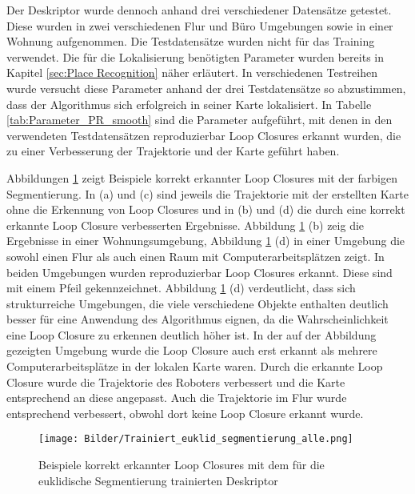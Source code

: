 Der Deskriptor wurde dennoch anhand drei verschiedener Datensätze getestet. Diese wurden in zwei verschiedenen Flur und Büro Umgebungen sowie in einer Wohnung aufgenommen. Die Testdatensätze wurden nicht für das Training verwendet. Die für die Lokalisierung benötigten Parameter wurden bereits in Kapitel \ref{sec:Place Recognition} näher erläutert. In verschiedenen Testreihen wurde versucht diese Parameter anhand der drei Testdatensätze so abzustimmen, dass der Algorithmus sich erfolgreich in seiner Karte lokalisiert. In Tabelle \ref{tab:Parameter_PR_smooth} sind die Parameter aufgeführt, mit denen in den verwendeten Testdatensätzen reproduzierbar Loop Closures erkannt wurden, die zu einer Verbesserung der Trajektorie und der Karte geführt haben.

Abbildungen \ref{fig:PR_euklid_bb} zeigt Beispiele korrekt erkannter Loop Closures mit der farbigen Segmentierung. In (a) und (c) sind jeweils die Trajektorie mit der erstellten Karte ohne die Erkennung von Loop Closures und in (b) und (d) die durch eine korrekt erkannte Loop Closure verbesserten Ergebnisse. Abbildung \ref{fig:PR_euklid_bb} (b) zeig die Ergebnisse in einer Wohnungsumgebung, Abbildung \ref{fig:PR_euklid_bb} (d) in einer Umgebung die sowohl einen Flur als auch einen Raum mit Computerarbeitsplätzen zeigt. In beiden Umgebungen wurden reproduzierbar Loop Closures erkannt. Diese sind mit einem Pfeil gekennzeichnet. Abbildung \ref{fig:PR_euklid_bb} (d) verdeutlicht, dass sich strukturreiche Umgebungen, die viele verschiedene Objekte enthalten deutlich besser für eine Anwendung des Algorithmus eignen, da die Wahrscheinlichkeit eine Loop Closure zu erkennen deutlich höher ist. In der auf der Abbildung gezeigten Umgebung wurde die Loop Closure auch erst erkannt als mehrere Computerarbeitsplätze in der lokalen Karte waren. Durch die erkannte Loop Closure wurde die Trajektorie des Roboters verbessert und die Karte entsprechend an diese angepasst. Auch die Trajektorie im Flur wurde entsprechend verbessert, obwohl dort keine Loop Closure erkannt wurde. 

\begin{figure}
	\centering
	\texttt{[image: Bilder/Trainiert\_euklid\_segmentierung\_alle.png]}
	\caption{Beispiele korrekt erkannter Loop Closures mit dem für die euklidische Segmentierung trainierten Deskriptor }
	\label{fig:PR_euklid_bb}
\end{figure}


